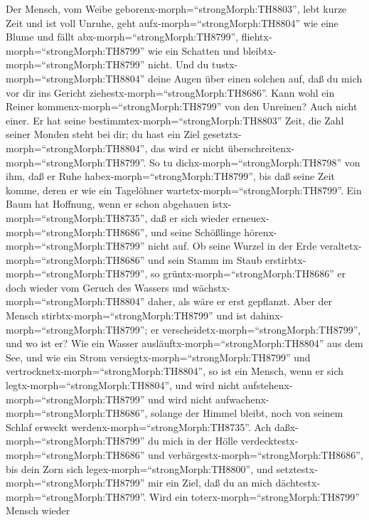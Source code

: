  Der Mensch, vom Weibe
geborenx-morph=``strongMorph:TH8803'', lebt kurze Zeit und ist voll
Unruhe,  geht aufx-morph=``strongMorph:TH8804'' wie eine
Blume und fällt abx-morph=``strongMorph:TH8799'',
fliehtx-morph=``strongMorph:TH8799'' wie ein Schatten und
bleibtx-morph=``strongMorph:TH8799'' nicht.  Und du
tustx-morph=``strongMorph:TH8804'' deine Augen über einen solchen auf,
daß du mich vor dir ins Gericht ziehestx-morph=``strongMorph:TH8686''.
 Kann wohl ein Reiner kommenx-morph=``strongMorph:TH8799''
von den Unreinen? Auch nicht einer.  Er hat seine
bestimmtex-morph=``strongMorph:TH8803'' Zeit, die Zahl seiner Monden
steht bei dir; du hast ein Ziel gesetztx-morph=``strongMorph:TH8804'',
das wird er nicht überschreitenx-morph=``strongMorph:TH8799''.
 So tu dichx-morph=``strongMorph:TH8798'' von ihm, daß er
Ruhe habex-morph=``strongMorph:TH8799'', bis daß seine Zeit komme, deren
er wie ein Tagelöhner wartetx-morph=``strongMorph:TH8799''. 
Ein Baum hat Hoffnung, wenn er schon abgehauen
istx-morph=``strongMorph:TH8735'', daß er sich wieder
erneuex-morph=``strongMorph:TH8686'', und seine Schößlinge
hörenx-morph=``strongMorph:TH8799'' nicht auf.  Ob seine
Wurzel in der Erde veraltetx-morph=``strongMorph:TH8686'' und sein Stamm
im Staub erstirbtx-morph=``strongMorph:TH8799'',  so
grüntx-morph=``strongMorph:TH8686'' er doch wieder vom Geruch des
Wassers und wächstx-morph=``strongMorph:TH8804'' daher, als wäre er erst
gepflanzt.  Aber der Mensch
stirbtx-morph=``strongMorph:TH8799'' und ist
dahinx-morph=``strongMorph:TH8799''; er
verscheidetx-morph=``strongMorph:TH8799'', und wo ist er? 
Wie ein Wasser ausläuftx-morph=``strongMorph:TH8804'' aus dem See, und
wie ein Strom versiegtx-morph=``strongMorph:TH8799'' und
vertrocknetx-morph=``strongMorph:TH8804'',  so ist ein
Mensch, wenn er sich legtx-morph=``strongMorph:TH8804'', und wird nicht
aufstehenx-morph=``strongMorph:TH8799'' und wird nicht
aufwachenx-morph=``strongMorph:TH8686'', solange der Himmel bleibt, noch
von seinem Schlaf erweckt werdenx-morph=``strongMorph:TH8735''.
 Ach daßx-morph=``strongMorph:TH8799'' du mich in der Hölle
verdecktestx-morph=``strongMorph:TH8686'' und
verbärgestx-morph=``strongMorph:TH8686'', bis dein Zorn sich
legex-morph=``strongMorph:TH8800'', und
setztestx-morph=``strongMorph:TH8799'' mir ein Ziel, daß du an mich
dächtestx-morph=``strongMorph:TH8799''.  Wird ein
toterx-morph=``strongMorph:TH8799'' Mensch wieder
